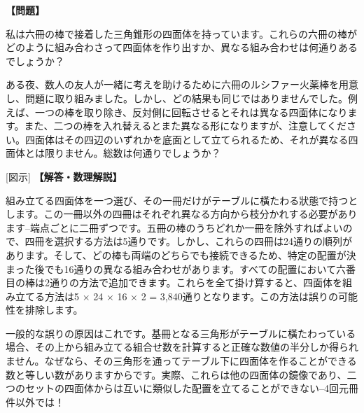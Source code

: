 \documentclass[10pt,a4paper,oneside,openany]{ltjsbook}
\begin{document}
\begin{tcolorbox}[colback=softblue,colframe=primaryblue,title=\textbf{第 280 問：四面体を組み立てる方法 （原題: BUILDING THE TETRAHEDRON.）},arc=2mm,boxrule=1pt,breakable]
\textbf{【問題】}\par\vspace{0.3em}
私は六冊の棒で接着した三角錐形の四面体を持っています。これらの六冊の棒がどのように組み合わさって四面体を作り出すか、異なる組み合わせは何通りあるでしょうか？

ある夜、数人の友人が一緒に考えを助けるために六冊のルシファー火薬棒を用意し、問題に取り組みました。しかし、どの結果も同じではありませんでした。例えば、一つの棒を取り除き、反対側に回転させるとそれは異なる四面体になります。また、二つの棒を入れ替えるとまた異なる形になりますが、注意してください。四面体はその四辺のいずれかを底面として立てられるため、それが異なる四面体とは限りません。総数は何通りでしょうか？

[図示]
\tcblower
\textbf{【解答・数理解説】}\par\vspace{0.3em}
組み立てる四面体を一つ選び、その一冊だけがテーブルに橫たわる狀態で持つとします。この一冊以外の四冊はそれぞれ異なる方向から枝分かれする必要があります--端点ごとに二冊ずつです。五冊の棒のうちどれか一冊を除外すればよいので、四冊を選択する方法は5通りです。しかし、これらの四冊は24通りの順列があります。そして、どの棒も両端のどちらでも接続できるため、特定の配置が決まった後でも16通りの異なる組み合わせがあります。すべての配置において六番目の棒は2通りの方法で追加できます。これらを全て掛け算すると、四面体を組み立てる方法は5 × 24 × 16 × 2 = 3,840通りとなります。この方法は誤りの可能性を排除します。

一般的な誤りの原因はこれです。基冊となる三角形がテーブルに橫たわっている場合、その上から組み立てる組合せ数を計算すると正確な数値の半分しか得られません。なぜなら、その三角形を通ってテーブル下に四面体を作ることができる数と等しい数がありますからです。実際、これらは他の四面体の鏡像であり、二つのセットの四面体からは互いに類似した配置を立てることができない--4回元冊件以外では！
\end{tcolorbox}
\end{document}
